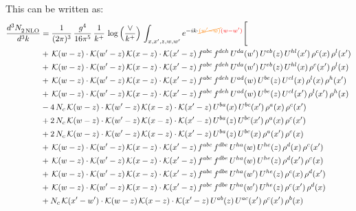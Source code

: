 \documentclass[9pt]{article}
\numberwithin{equation}{section}
\begin{document}
This can be written as:
\begin{align}
    \frac{d^{3}N_{2\,\rm NLO}^{\rm}}{d^{3}k}  & = \frac{1}{(2\pi)^{3}}\,\frac{g^{4}}{16\pi^{5}}\,\frac{1}{k^{+}}\,\log{\left(\frac{\vee}{k^{+}}\right)}\, \int_{x,x',z,w,w'}e^{-ik\cdot{\color{orange}\cancel{(w'-w)}}{\color{red}(w-w')}}\Bigg[\notag\\ &
    +\,\mathcal{K}(w-z)\cdot\mathcal{K}(w'-z)\,\mathcal{K}(x-z)\cdot\mathcal{K}(x'-z)\,f^{abc}\,f^{deh}\,U^{da}(w')\,U^{eb}(z)\,U^{hl}(x')\,\rho^{c}(x)\,\rho^{l}(x')\notag \\
&+\,\mathcal{K}(w-z)\cdot\mathcal{K}(w'-z)\,\mathcal{K}(x-z)\cdot\mathcal{K}(x'-z)\,f^{abc}\,f^{deh}\,U^{da}(w')\,U^{eb}(z)\,U^{hl}(x)\,\rho^{c}(x')\,\rho^{l}(x)\notag \\
&+\,\mathcal{K}(w-z)\cdot\mathcal{K}(w'-z)\,\mathcal{K}(x-z)\cdot\mathcal{K}(x'-z)\,f^{abc}\,f^{deh}\,U^{ad}(w)\,U^{be}(z)\,U^{cl}(x)\,\rho^{l}(x)\,\rho^{h}(x')\notag \\
&+\,\mathcal{K}(w-z)\cdot\mathcal{K}(w'-z)\,\mathcal{K}(x-z)\cdot\mathcal{K}(x'-z)\,f^{abc}\,f^{deh}\,U^{ad}(w)\,U^{be}(z)\,U^{cl}(x')\,\rho^{l}(x')\,\rho^{h}(x)\notag \\
&-4\,N_{c}\,\mathcal{K}(w-z)\cdot\mathcal{K}(w'-z)\,\mathcal{K}(x-z)\cdot\mathcal{K}(x'-z)\,U^{ba}(x)\,U^{bc}(x')\,\rho^{a}(x)\,\rho^{c}(x')\notag \\
&+2\,N_{c}\,\mathcal{K}(w-z)\cdot\mathcal{K}(w'-z)\,\mathcal{K}(x-z)\cdot\mathcal{K}(x'-z)\,U^{ba}(z)\,U^{bc}(x')\,\rho^{a}(x)\,\rho^{c}(x')\notag \\
&+2\,N_{c}\,\mathcal{K}(w-z)\cdot\mathcal{K}(w'-z)\,\mathcal{K}(x-z)\cdot\mathcal{K}(x'-z)\,U^{ba}(z)\,U^{bc}(x)\,\rho^{a}(x')\,\rho^{c}(x)\notag \\
&+\,\mathcal{K}(w-z)\cdot\mathcal{K}(w'-z)\,\mathcal{K}(x-z)\cdot\mathcal{K}(x'-z)\,f^{abc}\,f^{dbe}\,U^{ha}(w)\,U^{he}(z)\,\rho^{d}(x)\,\rho^{c}(x')\notag \\
&+\,\mathcal{K}(w-z)\cdot\mathcal{K}(w'-z)\,\mathcal{K}(x-z)\cdot\mathcal{K}(x'-z)\,f^{abc}\,f^{dbe}\,U^{ha}(w)\,U^{he}(z)\,\rho^{d}(x')\,\rho^{c}(x)\notag \\
&+\,\mathcal{K}(w-z)\cdot\mathcal{K}(w'-z)\,\mathcal{K}(x-z)\cdot\mathcal{K}(x'-z)\,f^{abc}\,f^{dbe}\,U^{ha}(w')\,U^{he}(z)\,\rho^{c}(x)\,\rho^{d}(x')\notag \\
&+\,\mathcal{K}(w-z)\cdot\mathcal{K}(w'-z)\,\mathcal{K}(x-z)\cdot\mathcal{K}(x'-z)\,f^{abc}\,f^{dbe}\,U^{ha}(w')\,U^{he}(z)\,\rho^{c}(x')\,\rho^{d}(x)\notag \\
&+N_{c}\,\mathcal{K}(x'-w')\cdot\mathcal{K}(w-z)\,\mathcal{K}(x-z)\cdot\mathcal{K}(x'-z)\,U^{ab}(z)\,U^{ac}(x')\,\rho^{c}(x')\,\rho^{b}(x)\notag \\

\end{align}
\end{document}
